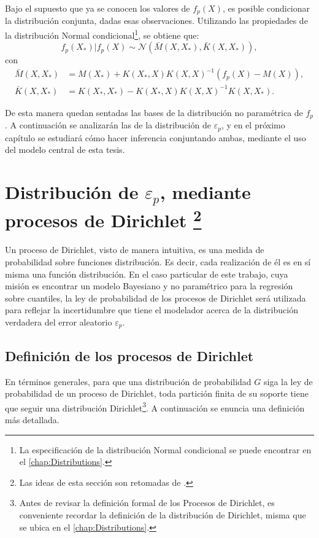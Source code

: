 Bajo el supuesto que ya se conocen los valores de $f_p(X)$, es posible condicionar la distribución conjunta, dadas esas observaciones. Utilizando las propiedades de la distribución Normal condicional\footnote{La especificaci\'on de la distribuci\'on Normal condicional se puede encontrar en el \autoref{chap:Distributions}.}, se obtiene que:
\begin{equation*}
    f_p(X_*)|f_p(X) 
    \sim \mathcal{N}
    (\bar{M}(X,X_*),\bar{K}(X,X_*)),
\end{equation*}
con
\begin{equation*}
\begin{aligned}
    \bar{M}(X,X_*) &= M(X_*) + K(X_*,X)K(X,X)^{-1}(f_p(X) - M(X)), \\
    \bar{K}(X,X_*) &= K(X_*,X_*) - K(X_*,X)K(X,X)^{-1}K(X,X_*).
\end{aligned}
\end{equation*}

De esta manera quedan sentadas las bases de la distribuci\'on no param\'etrica de $f_p$. A continuaci\'on se analizar\'an las de la distribuci\'on de $\varepsilon_p$, y en el pr\'oximo cap\'itulo se estudiar\'a c\'omo hacer inferencia conjuntando ambas, mediante el uso del modelo central de esta tesis.

\section[Distribuci\'on de $\varepsilon_p$, mediante procesos de Dirichlet]{
    Distribuci\'on de $\varepsilon_p$, mediante procesos de Dirichlet
    \footnote{Las ideas de esta secci\'on son retomadas de \cite{Yee_DirProc}.}
}

Un proceso de Dirichlet, visto de manera intuitiva, es una medida de probabilidad sobre funciones distribuci\'on. Es decir, cada realizaci\'on de él es en sí misma una funci\'on distribuci\'on. En el caso particular de este trabajo, cuya misi\'on es encontrar un modelo Bayesiano y no param\'etrico para la regresi\'on sobre cuantiles, la ley de probabilidad de los procesos de Dirichlet ser\'a utilizada para reflejar la incertidumbre que tiene el modelador acerca de la distribuci\'on verdadera del error aleatorio $\varepsilon_p$.

\subsection{Definici\'on de los procesos de Dirichlet}

En t\'erminos generales, para que una distribuci\'on de probabilidad $G$ siga la ley de probabilidad de un proceso de Dirichlet, toda partici\'on finita de su soporte tiene que seguir una distribuci\'on Dirichlet\footnote{Antes de revisar la definici\'on formal de los Procesos de Dirichlet, es conveniente recordar la definici\'on de la distribuci\'on de Dirichlet, misma que se ubica en el \autoref{chap:Distributions}.}. A continuaci\'on se enuncia una definici\'on m\'as detallada.

